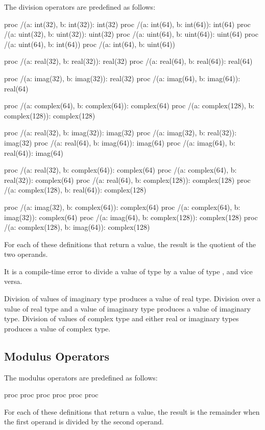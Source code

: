 The division operators are predefined as follows:
\begin{chapel}
proc /(a: int(32), b: int(32)): int(32)
proc /(a: int(64), b: int(64)): int(64)
proc /(a: uint(32), b: uint(32)): uint(32)
proc /(a: uint(64), b: uint(64)): uint(64)
proc /(a: uint(64), b: int(64))
proc /(a: int(64), b: uint(64))

proc /(a: real(32), b: real(32)): real(32)
proc /(a: real(64), b: real(64)): real(64)

proc /(a: imag(32), b: imag(32)): real(32)
proc /(a: imag(64), b: imag(64)): real(64)

proc /(a: complex(64), b: complex(64)): complex(64)
proc /(a: complex(128), b: complex(128)): complex(128)

proc /(a: real(32), b: imag(32)): imag(32)
proc /(a: imag(32), b: real(32)): imag(32)
proc /(a: real(64), b: imag(64)): imag(64)
proc /(a: imag(64), b: real(64)): imag(64)

proc /(a: real(32), b: complex(64)): complex(64)
proc /(a: complex(64), b: real(32)): complex(64)
proc /(a: real(64), b: complex(128)): complex(128)
proc /(a: complex(128), b: real(64)): complex(128)

proc /(a: imag(32), b: complex(64)): complex(64)
proc /(a: complex(64), b: imag(32)): complex(64)
proc /(a: imag(64), b: complex(128)): complex(128)
proc /(a: complex(128), b: imag(64)): complex(128)
\end{chapel}
For each of these definitions that return a value, the result is the
quotient of the two operands.

It is a compile-time error to divide a value of type  by
a value of type , and vice versa.

Division of values of imaginary type produces a value of real type.
Division over a value of real type and a value of imaginary type
produces a value of imaginary type.  Division of values of complex
type and either real or imaginary types produces a value of complex
type.

\subsection{Modulus Operators}
\label{Modulus_Operators}

The modulus operators are predefined as follows:
\begin{chapel}
proc %
proc %
proc %
proc %
proc %
proc %
\end{chapel}
For each of these definitions that return a value, the result is the
remainder when the first operand is divided by the second operand.

